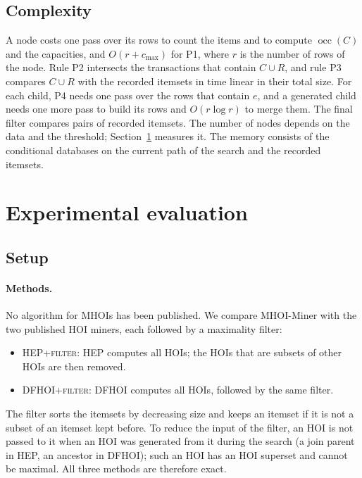 \documentclass[pdflatex,sn-mathphys,Numbered]{sn-jnl}
\theoremstyle{thmstyleone}
\theoremstyle{thmstyletwo}
\theoremstyle{thmstylethree}
\newcommand{\occ}{\operatorname{occ}}
\newcommand{\Algo}{MHOI-Miner}
\begin{document}
\subsection{Complexity}

A node costs one pass over its rows to count the items and to compute $\occ(C)$ and the capacities, and $O(r + c_{\max})$ for P1, where $r$ is the number of rows of the node. Rule P2 intersects the transactions that contain $C \cup R$, and rule P3 compares $C \cup R$ with the recorded itemsets in time linear in their total size. For each child, P4 needs one pass over the rows that contain $e$, and a generated child needs one more pass to build its rows and $O(r \log r)$ to merge them. The final filter compares pairs of recorded itemsets. The number of nodes depends on the data and the threshold; Section~\ref{sec:exp} measures it. The memory consists of the conditional databases on the current path of the search and the recorded itemsets.

\section{Experimental evaluation}\label{sec:exp}

\subsection{Setup}\label{sec:setup}

\paragraph{Methods.}
No algorithm for MHOIs has been published. We compare \Algo{} with the two published HOI miners, each followed by a maximality filter:
\begin{itemize}
\item \textsc{HEP+filter}: HEP \cite{deng2020hoi} computes all HOIs; the HOIs that are subsets of other HOIs are then removed.
\item \textsc{DFHOI+filter}: DFHOI \cite{nguyen2023dfhoi} computes all HOIs, followed by the same filter.
\end{itemize}
The filter sorts the itemsets by decreasing size and keeps an itemset if it is not a subset of an itemset kept before. To reduce the input of the filter, an HOI is not passed to it when an HOI was generated from it during the search (a join parent in HEP, an ancestor in DFHOI); such an HOI has an HOI superset and cannot be maximal. All three methods are therefore exact.
\end{document}
